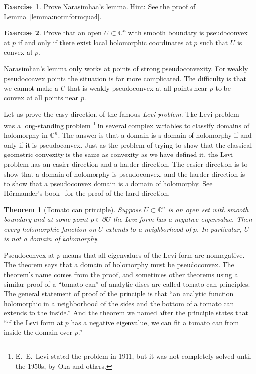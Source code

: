 \documentclass[12pt,openany]{book}
\newcommand{\C}{{\mathbb{C}}}
\newcommand{\myindex}[1]{#1\index{#1}}
\theoremstyle{plain}
\newtheorem{thm}{Theorem}[section]
\theoremstyle{remark}
\theoremstyle{definition}
\newenvironment{exbox}{%
    \def\FrameCommand{\vrule width 1pt \relax\hspace{10pt}}%
    \MakeFramed {\advance \hsize -\width \FrameRestore}%
}{%
    \endMakeFramed
}
\theoremstyle{exercise}
\newtheorem{exercise}{Exercise}[section]
\theoremstyle{example}
\newcommand{\lemmaref}[1]{\hyperref[#1]{Lemma~\ref*{#1}}}
\begin{document}
\begin{exbox}
\begin{exercise}
Prove Narasimhan's lemma.  Hint: See the proof of \lemmaref{lemma:normformquad}.
\end{exercise}

\begin{exercise}
Prove that an open $U \subset \C^n$ with smooth boundary is pseudoconvex at
$p$ if and only if there exist local holomorphic coordinates at $p$ such that 
$U$ is convex at $p$.
\end{exercise}
\end{exbox}

Narasimhan's lemma only works at points of strong
pseudoconvexity.  For weakly pseudoconvex points the situation is far more
complicated.  The difficulty is that we cannot make a $U$ that is
weakly pseudoconvex at all points near $p$ to be convex at all points near $p$.

\medskip


Let us prove the easy direction of the famous 
\emph{\myindex{Levi problem}}.  The Levi problem was a long-standing
problem%
\footnote{E.\ E.\ Levi stated the problem in 1911, but it was not completely
solved until the 1950s, by Oka and others.}
in several complex variables to classify domains of holomorphy in
$\C^n$.  The answer is that a domain is a domain of holomorphy if and only
if it is pseudoconvex.  Just as the problem of trying to show that
the classical geometric convexity is the same as convexity as we have
defined it, 
the Levi problem has an easier direction and a harder direction.
The easier direction is to show that a domain of holomorphy is pseudoconvex, and
the harder direction is to show that a pseudoconvex domain is a domain of
holomorphy.  See H\"ormander's book~\cite{Hormander} for the proof
of the hard direction.

\begin{thm}[Tomato can principle] \label{thm:tomatocan}
Suppose
$U \subset \C^n$ is an open set with smooth boundary and at some point $p \in
\partial U$ the Levi form has a negative eigenvalue.
Then every holomorphic function on $U$
extends to a neighborhood of $p$.
In particular, $U$ is not
a domain of holomorphy.
\end{thm}

Pseudoconvex at $p$ means that all eigenvalues of the Levi form are
nonnegative.
The theorem says that a domain of holomorphy must be pseudoconvex.
The theorem's name comes from the proof, and sometimes other theorems using a
similar proof of a ``tomato can'' of analytic discs are called
tomato can principles.
The general statement of proof of the principle is that ``an
analytic function holomorphic in a neighborhood of the sides and the bottom
of a tomato can extends to the inside.''  And the theorem we named after
the principle states that ``if the Levi form at $p$ has a negative
eigenvalue, we can fit a tomato can from inside the domain over $p$.''
\end{document}
